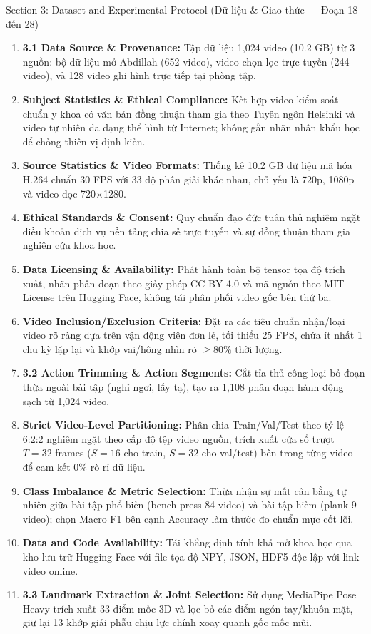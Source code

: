 \documentclass[10pt,a4paper]{article}
\begin{document}
\begin{secbox}{Section 3: Dataset and Experimental Protocol (Dữ liệu \& Giao thức — Đoạn 18 đến 28)}
\begin{enumerate}[leftmargin=*, itemsep=2pt, topsep=1pt, start=18]
    \item \textbf{3.1 Data Source \& Provenance:} Tập dữ liệu 1,024 video (10.2 GB) từ 3 nguồn: bộ dữ liệu mở Abdillah (652 video), video chọn lọc trực tuyến (244 video), và 128 video ghi hình trực tiếp tại phòng tập.
    \item \textbf{Subject Statistics \& Ethical Compliance:} Kết hợp video kiểm soát chuẩn y khoa có văn bản đồng thuận tham gia theo Tuyên ngôn Helsinki và video tự nhiên đa dạng thể hình từ Internet; không gắn nhãn nhân khẩu học để chống thiên vị định kiến.
    \item \textbf{Source Statistics \& Video Formats:} Thống kê 10.2 GB dữ liệu mã hóa H.264 chuẩn 30 FPS với 33 độ phân giải khác nhau, chủ yếu là 720p, 1080p và video dọc 720$\times$1280.
    \item \textbf{Ethical Standards \& Consent:} Quy chuẩn đạo đức tuân thủ nghiêm ngặt điều khoản dịch vụ nền tảng chia sẻ trực tuyến và sự đồng thuận tham gia nghiên cứu khoa học.
    \item \textbf{Data Licensing \& Availability:} Phát hành toàn bộ tensor tọa độ trích xuất, nhãn phân đoạn theo giấy phép CC BY 4.0 và mã nguồn theo MIT License trên Hugging Face, không tái phân phối video gốc bên thứ ba.
    \item \textbf{Video Inclusion/Exclusion Criteria:} Đặt ra các tiêu chuẩn nhận/loại video rõ ràng dựa trên vận động viên đơn lẻ, tối thiểu 25 FPS, chứa ít nhất 1 chu kỳ lặp lại và khớp vai/hông nhìn rõ $\ge 80\%$ thời lượng.
    \item \textbf{3.2 Action Trimming \& Action Segments:} Cắt tỉa thủ công loại bỏ đoạn thừa ngoài bài tập (nghỉ ngơi, lấy tạ), tạo ra 1,108 phân đoạn hành động sạch từ 1,024 video.
    \item \textbf{Strict Video-Level Partitioning:} Phân chia Train/Val/Test theo tỷ lệ 6:2:2 nghiêm ngặt theo cấp độ tệp video nguồn, trích xuất cửa sổ trượt $T=32$ frames ($S=16$ cho train, $S=32$ cho val/test) bên trong từng video để cam kết 0\% rò rỉ dữ liệu.
    \item \textbf{Class Imbalance \& Metric Selection:} Thừa nhận sự mất cân bằng tự nhiên giữa bài tập phổ biến (bench press 84 video) và bài tập hiếm (plank 9 video); chọn Macro F1 bên cạnh Accuracy làm thước đo chuẩn mực cốt lõi.
    \item \textbf{Data and Code Availability:} Tái khẳng định tính khả mở khoa học qua kho lưu trữ Hugging Face với file tọa độ NPY, JSON, HDF5 độc lập với link video online.
    \item \textbf{3.3 Landmark Extraction \& Joint Selection:} Sử dụng MediaPipe Pose Heavy trích xuất 33 điểm mốc 3D và lọc bỏ các điểm ngón tay/khuôn mặt, giữ lại 13 khớp giải phẫu chịu lực chính xoay quanh gốc mốc mũi.
\end{enumerate}
\end{secbox}
\end{document}
